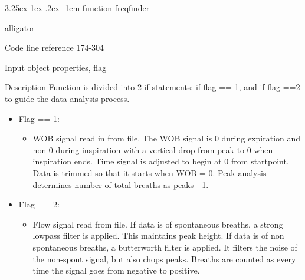 \documentclass[12pt, openany, oneside]{book}
\makeatletter
\renewcommand\subparagraph{\@startsection{subparagraph}{6}{\parindent}%
  {3.25ex \@plus1ex \@minus .2ex}%
  {-1em}%
  {\normalfont\normalsize\bfseries}}
\makeatother
\begin{document}
\subparagraph{function freqfinder}
\begin{labeling}{alligator}
\item[Code line reference] 174-304
\item[Input] object properties, flag
\item[Description] Function is divided into 2 if statements: if flag == 1, and if flag ==2  to guide the data analysis process.
\begin{itemize}
\item Flag == 1:
\begin{itemize}
\item WOB signal read in from file. The WOB signal is 0 during expiration and non 0 during inspiration with a vertical drop from peak to 0 when inspiration ends. Time signal is adjusted to begin at 0 from startpoint. Data is trimmed so that it starts when WOB = 0. Peak analysis determines number of total breaths as peaks - 1. 
\end{itemize}
\item Flag == 2:
\begin{itemize}
\item Flow signal read from file. If data is of spontaneous breaths, a strong lowpass filter is applied. This maintains peak height. If data is of non spontaneous breaths, a butterworth filter is applied. It filters the noise of the non-spont signal, but also chops peaks. Breaths are counted as every time the signal goes from negative to positive.
\end{itemize}
\end{itemize}
\end{labeling}
\end{document}
